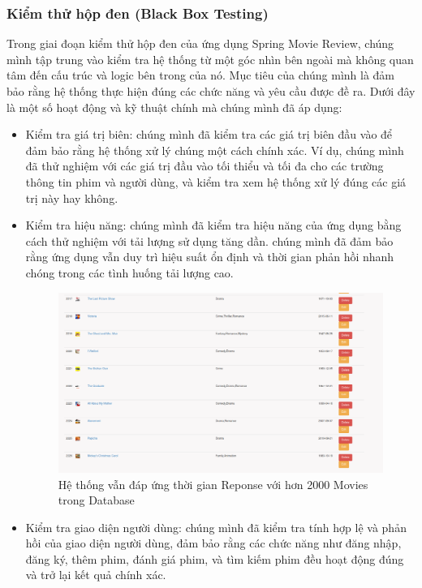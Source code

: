\documentclass[12pt]{article}
\begin{document}
\subsubsection{Kiểm thử hộp đen (Black Box Testing)}
Trong giai đoạn kiểm thử hộp đen của ứng dụng Spring Movie Review, chúng mình tập trung vào kiểm tra hệ thống từ một góc nhìn bên ngoài mà không quan tâm đến cấu trúc và logic bên trong của nó. Mục tiêu của chúng mình là đảm bảo rằng hệ thống thực hiện đúng các chức năng và yêu cầu được đề ra. Dưới đây là một số hoạt động và kỹ thuật chính mà chúng mình đã áp dụng:
\begin{itemize}
    \item Kiểm tra giá trị biên: chúng mình đã kiểm tra các giá trị biên đầu vào để đảm bảo rằng hệ thống xử lý chúng một cách chính xác. Ví dụ, chúng mình đã thử nghiệm với các giá trị đầu vào tối thiểu và tối đa cho các trường thông tin phim và người dùng, và kiểm tra xem hệ thống xử lý đúng các giá trị này hay không.
    
    \item Kiểm tra hiệu năng: chúng mình đã kiểm tra hiệu năng của ứng dụng bằng cách thử nghiệm với tải lượng sử dụng tăng dần. chúng mình đã đảm bảo rằng ứng dụng vẫn duy trì hiệu suất ổn định và thời gian phản hồi nhanh chóng trong các tình huống tải lượng cao.
    \begin{figure}[H]
        \centering
        \includegraphics[scale=0.4]{Figs/AdminMovies.png}
        \caption{Hệ thống vẫn đáp ứng thời gian Reponse với hơn 2000 Movies trong Database}
    \end{figure}

    \item Kiểm tra giao diện người dùng: chúng mình đã kiểm tra tính hợp lệ và phản hồi của giao diện người dùng, đảm bảo rằng các chức năng như đăng nhập, đăng ký, thêm phim, đánh giá phim, và tìm kiếm phim đều hoạt động đúng và trở lại kết quả chính xác.


\end{itemize}
\end{document}
